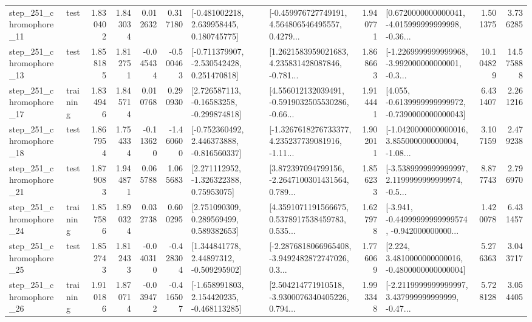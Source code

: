 \begin{tabular}{llrrrrllrlrr}
  step\_251\_chromophore\_11 &      test &      1.830402 &    1.843034 &      0.012632 &  0.317180 &    [-0.481002218, 2.639958445, 0.180745775] &  [-0.459976727749191, 4.564806546495557, 0.4279... &       1.940771 &  [0.6720000000000041, -4.015999999999998, -0.36... &            1.501375 &          3.736285 \\
  step\_251\_chromophore\_13 &      test &      1.858185 &    1.812751 &     -0.045434 & -0.500463 &   [-0.711379907, -2.530542428, 0.251470818] &  [1.2621583959021683, 4.235831428087846, -0.781... &       1.868663 &  [-1.2269999999999968, -3.992000000000001, -0.3... &           10.104829 &         14.575888 \\
  step\_251\_chromophore\_17 &  training &      1.834946 &    1.845714 &      0.010768 &  0.290930 &    [2.726587113, -0.16583258, -0.299874818] &  [4.556012132039491, -0.5919032505530286, -0.66... &       1.914441 &  [4.055, -0.6139999999999972, -0.7390000000000043] &            6.431407 &          2.261216 \\
  step\_251\_chromophore\_18 &      test &      1.867954 &    1.754334 &     -0.113620 & -1.460600 &   [-0.752360492, 2.446373888, -0.816560337] &  [-1.3267618276733377, 4.235237739081916, -1.11... &       1.902011 &  [-1.0420000000000016, 3.855000000000004, -1.08... &            3.107159 &          2.479238 \\
  step\_251\_chromophore\_21 &      test &      1.879083 &    1.944871 &      0.065788 &  1.065683 &     [2.271112952, -1.326322388, 0.75953075] &  [3.872397094799156, -2.2647100301431564, 0.789... &       1.856233 &  [-3.5389999999999997, 2.1199999999999974, -0.5... &            8.877743 &          2.796970 \\
  step\_251\_chromophore\_24 &  training &      1.857586 &    1.890324 &      0.032738 &  0.600295 &     [2.751090309, 0.289569499, 0.589382653] &  [4.3591071191566675, 0.5378917538459783, 0.535... &       1.627978 &  [-3.941, -0.44999999999999574, -0.942000000000... &            1.420078 &          6.431457 \\
  step\_251\_chromophore\_25 &      test &      1.852743 &    1.812433 &     -0.040310 & -0.428304 &     [1.344841778, 2.44897312, -0.509295902] &  [-2.2876818066965408, -3.9492482872747026, 0.3... &       1.776069 &   [2.224, 3.4810000000000016, -0.4800000000000004] &            5.276363 &          3.043717 \\
  step\_251\_chromophore\_26 &  training &      1.910186 &    1.870714 &     -0.039472 & -0.416507 &   [-1.658991803, 2.154420235, -0.468113285] &  [2.504214771910518, -3.9300076340405226, 0.794... &       1.993348 &  [-2.2119999999999997, 3.437999999999999, -0.47... &            5.728128 &          3.054405 \\

\end{tabular}
